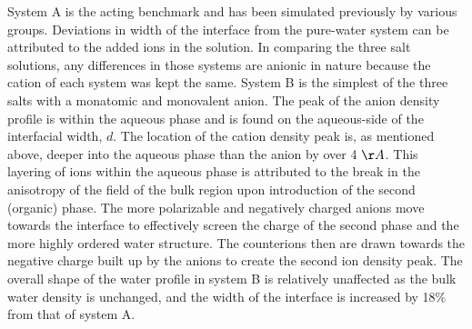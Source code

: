System A is the acting benchmark and has been simulated previously by various groups. Deviations in width of the interface from the pure-water system can be attributed to the added ions in the solution. In comparing the three salt solutions, any differences in those systems are anionic in nature because the cation of each system was kept the same. System B is the simplest of the three salts with a monatomic and monovalent anion. The peak of the anion density profile is within the aqueous phase and is found on the aqueous-side of the interfacial width, $d$. The location of the cation density peak is, as mentioned above, deeper into the aqueous phase than the anion by over 4 $\AA$. This layering of ions within the aqueous phase is attributed to the break in the anisotropy of the field of the bulk region upon introduction of the second (organic) phase. The more polarizable and negatively charged anions move towards the interface to effectively screen the charge of the second phase and the more highly ordered water structure. The counterions then are drawn towards the negative charge built up by the anions to create the second ion density peak. The overall shape of the water profile in system B is relatively unaffected as the bulk water density is unchanged, and the width of the interface is increased by 18\% from that of system A. 

